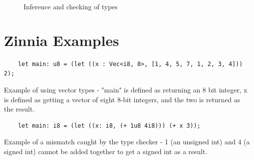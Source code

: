 \documentclass[12pt]{article}
\begin{document}
\begin{figure}[htbp]
\begin{subfigure}{\linewidth}
    \end{subfigure}
    \caption{Inference and checking of types}
\end{figure}

\clearpage
\section{Zinnia Examples}
\begin{lstlisting}
    let main: u8 = (let ((x : Vec<i8, 8>, [1, 4, 5, 7, 1, 2, 3, 4])) 2);
\end{lstlisting}
Example of using vector types - "main" is defined as returning an 8 bit integer, x is defined as getting a vector of eight 8-bit integers, and the two is returned as the result.
\begin{lstlisting}
    let main: i8 = (let ((x: i8, (+ 1u8 4i8))) (+ x 3));
\end{lstlisting}
Example of a mismatch caught by the type checker - 1 (an unsigned int) and 4 (a signed int) cannot be added together to get a signed int as a result.
\clearpage
\nocite{*}
\printbibliography
\end{document}
